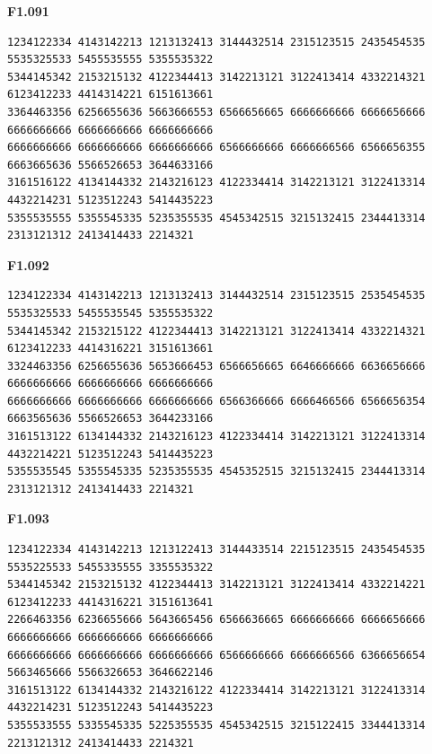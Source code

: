 \noindent\begin{minipage}{\linewidth}\textbf{F1.091}
\begin{lstlisting}
1234122334 4143142213 1213132413 3144432514 2315123515 2435454535 5535325533 5455535555 5355535322
5344145342 2153215132 4122344413 3142213121 3122413414 4332214321 6123412233 4414314221 6151613661
3364463356 6256655636 5663666553 6566656665 6666666666 6666656666 6666666666 6666666666 6666666666
6666666666 6666666666 6666666666 6566666666 6666666566 6566656355 6663665636 5566526653 3644633166
3161516122 4134144332 2143216123 4122334414 3142213121 3122413314 4432214231 5123512243 5414435223
5355535555 5355545335 5235355535 4545342515 3215132415 2344413314 2313121312 2413414433 2214321
\end{lstlisting}
\end{minipage}\par\smallskip

\noindent\begin{minipage}{\linewidth}\textbf{F1.092}
\begin{lstlisting}
1234122334 4143142213 1213132413 3144432514 2315123515 2535454535 5535325533 5455535545 5355535322
5344145342 2153215122 4122344413 3142213121 3122413414 4332214321 6123412233 4414316221 3151613661
3324463356 6256655636 5653666453 6566656665 6646666666 6636656666 6666666666 6666666666 6666666666
6666666666 6666666666 6666666666 6566366666 6666466566 6566656354 6663565636 5566526653 3644233166
3161513122 6134144332 2143216123 4122334414 3142213121 3122413314 4432214221 5123512243 5414435223
5355535545 5355545335 5235355535 4545352515 3215132415 2344413314 2313121312 2413414433 2214321
\end{lstlisting}
\end{minipage}\par\smallskip

\noindent\begin{minipage}{\linewidth}\textbf{F1.093}
\begin{lstlisting}
1234122334 4143142213 1213122413 3144433514 2215123515 2435454535 5535225533 5455335555 3355535322
5344145342 2153215132 4122344413 3142213121 3122413414 4332214221 6123412233 4414316221 3151613641
2266463356 6236655666 5643665456 6566636665 6666666666 6666656666 6666666666 6666666666 6666666666
6666666666 6666666666 6666666666 6566666666 6666666566 6366656654 5663465666 5566326653 3646622146
3161513122 6134144332 2143216122 4122334414 3142213121 3122413314 4432214231 5123512243 5414435223
5355533555 5335545335 5225355535 4545342515 3215122415 3344413314 2213121312 2413414433 2214321
\end{lstlisting}
\end{minipage}\par\smallskip

